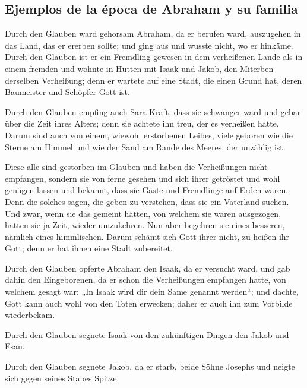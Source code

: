 \hypertarget{ejemplos-de-la-uxe9poca-de-abraham-y-su-familia}{%
\subsection{Ejemplos de la época de Abraham y su
familia}\label{ejemplos-de-la-uxe9poca-de-abraham-y-su-familia}}

 Durch den Glauben ward gehorsam Abraham, da er berufen
ward, auszugehen in das Land, das er ererben sollte; und ging aus und
wusste nicht, wo er hinkäme.  Durch den Glauben ist er ein
Fremdling gewesen in dem verheißenen Lande als in einem fremden und
wohnte in Hütten mit Isaak und Jakob, den Miterben derselben Verheißung;
 denn er wartete auf eine Stadt, die einen Grund hat,
deren Baumeister und Schöpfer Gott ist.

 Durch den Glauben empfing auch Sara Kraft, dass sie
schwanger ward und gebar über die Zeit ihres Alters; denn sie achtete
ihn treu, der es verheißen hatte.  Darum sind auch von
einem, wiewohl erstorbenen Leibes, viele geboren wie die Sterne am
Himmel und wie der Sand am Rande des Meeres, der unzählig ist.

 Diese alle sind gestorben im Glauben und haben die
Verheißungen nicht empfangen, sondern sie von ferne gesehen und sich
ihrer getröstet und wohl genügen lassen und bekannt, dass sie Gäste und
Fremdlinge auf Erden wären.  Denn die solches sagen, die
geben zu verstehen, dass sie ein Vaterland suchen.  Und
zwar, wenn sie das gemeint hätten, von welchem sie waren ausgezogen,
hatten sie ja Zeit, wieder umzukehren.  Nun aber begehren
sie eines besseren, nämlich eines himmlischen. Darum schämt sich Gott
ihrer nicht, zu heißen ihr Gott; denn er hat ihnen eine Stadt
zubereitet.

 Durch den Glauben opferte Abraham den Isaak, da er
versucht ward, und gab dahin den Eingeborenen, da er schon die
Verheißungen empfangen hatte,  von welchem gesagt war:
„In Isaak wird dir dein Same genannt werden``;  und
dachte, Gott kann auch wohl von den Toten erwecken; daher er auch ihn
zum Vorbilde wiederbekam.

 Durch den Glauben segnete Isaak von den zukünftigen
Dingen den Jakob und Esau.

 Durch den Glauben segnete Jakob, da er starb, beide
Söhne Josephs und neigte sich gegen seines Stabes Spitze.

